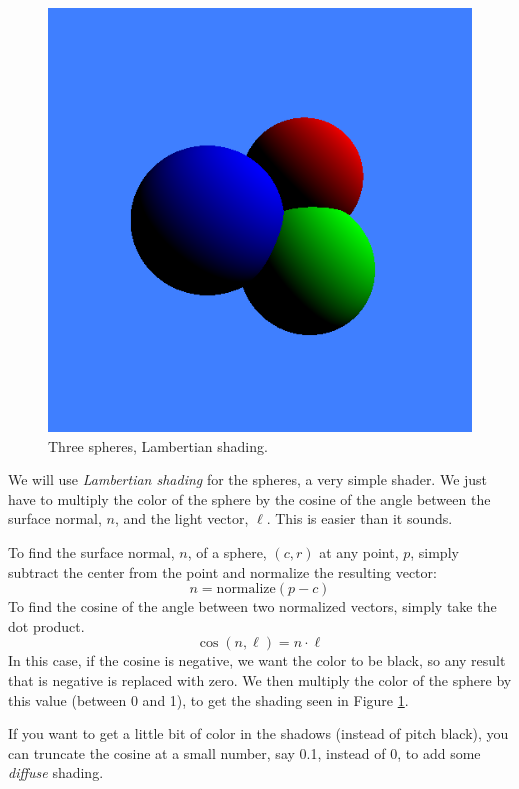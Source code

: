 \documentclass{article}
\begin{document}
\begin{description}
\begin{description}
\begin{figure}
  \centerline{\includegraphics[scale=0.5]{threelambertianspheres.png}}
  \caption{Three spheres, Lambertian shading.}
  \label{sphereslambertian}
\end{figure}

We will use {\em Lambertian shading}
for the spheres, a very simple shader.
We just have to multiply the
color of the sphere by the cosine of the angle between the surface
normal, $n$, and the light vector, $\ell$.  This is easier than it sounds.

To find the surface normal, $n$, of a sphere, $(c,r)$ at any point, $p$,
simply subtract the center from the point and normalize the
resulting vector:
\[
n = \mbox{normalize}(p-c)
\]
To find the cosine of the angle between two normalized vectors, simply
take the dot product.
\[
\cos(n,\ell) = n \cdot \ell
\]
In this case, if the cosine is negative, we want the color to be
black, so any result that is negative is replaced with zero.
We then multiply the color of the sphere by this value (between 0 and
1), to get the shading seen in Figure \ref{sphereslambertian}.

If you want to get a little bit of color in the shadows (instead of
pitch black), you can truncate the cosine at a small number, say 0.1,
instead of 0, to add some {\em diffuse} shading.


\end{description}
\end{description}
\end{document}
